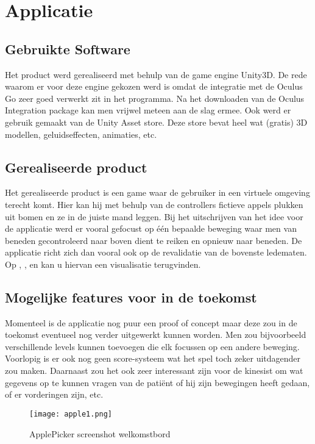\chapter{Applicatie}
\label{ch:applicatie}

\section{Gebruikte Software}
Het product werd gerealiseerd met behulp van de game engine Unity3D. De rede waarom er voor deze engine gekozen werd is omdat de integratie met de Oculus Go zeer goed verwerkt zit in het programma. Na het downloaden van de Oculus Integration package kan men vrijwel meteen aan de slag ermee. Ook werd er gebruik gemaakt van de Unity Asset store. Deze store bevat heel wat (gratis) 3D modellen, geluidseffecten, animaties, etc.

\section{Gerealiseerde product}
Het gerealiseerde product is een game waar de gebruiker in een virtuele omgeving terecht komt. Hier kan hij met behulp van de controllers fictieve appels plukken uit bomen en ze in de juiste mand leggen. Bij het uitschrijven van het idee voor de applicatie werd er vooral gefocust op één bepaalde beweging waar men van beneden gecontroleerd naar boven dient te reiken en opnieuw naar beneden. De applicatie richt zich dan vooral ook op de revalidatie van de bovenste ledematen. Op \cite{figuur 4.1}, \cite{figuur 4.2}, \cite{figuur 4.3} en \cite{figuur 4.4} kan u hiervan een visualisatie terugvinden.

\section{Mogelijke features voor in de toekomst}
Momenteel is de applicatie nog puur een proof of concept maar deze zou in de toekomst eventueel nog verder uitgewerkt kunnen worden. Men zou bijvoorbeeld verschillende levels kunnen toevoegen die elk focussen op een andere beweging. Voorlopig is er ook nog geen score-systeem wat het spel toch zeker uitdagender zou maken. Daarnaast zou het ook zeer interessant zijn voor de kinesist om wat gegevens op te kunnen vragen van de patiënt of hij zijn bewegingen heeft gedaan, of er vorderingen zijn, etc.

\begin{figure}[p]
    \centering
    \texttt{[image: apple1.png]}
    \caption{ApplePicker screenshot welkomstbord}
\end{figure}

